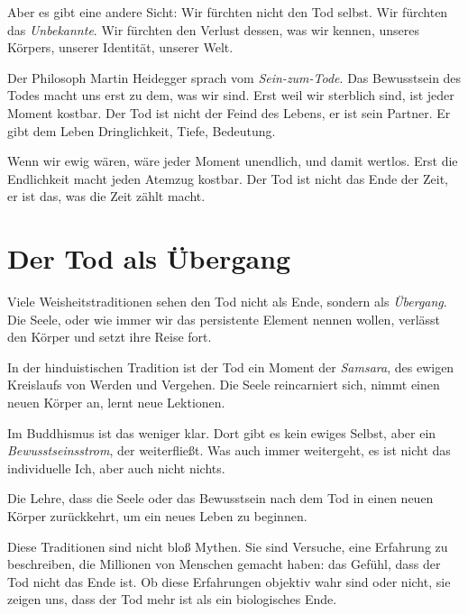 Aber es gibt eine andere Sicht: Wir fürchten nicht den Tod selbst. Wir fürchten das \emph{Unbekannte}. Wir fürchten den Verlust dessen, was wir kennen, unseres Körpers, unserer Identität, unserer Welt.

Der Philosoph Martin Heidegger \cite{Heidegger1927} sprach vom \emph{Sein-zum-Tode}. Das Bewusstsein des Todes macht uns erst zu dem, was wir sind. Erst weil wir sterblich sind, ist jeder Moment kostbar. Der Tod ist nicht der Feind des Lebens, er ist sein Partner. Er gibt dem Leben Dringlichkeit, Tiefe, Bedeutung.

Wenn wir ewig wären, wäre jeder Moment unendlich, und damit wertlos. Erst die Endlichkeit macht jeden Atemzug kostbar. Der Tod ist nicht das Ende der Zeit, er ist das, was die Zeit \glqq zählt\grqq{} macht.

\section{Der Tod als Übergang}

Viele Weisheitstraditionen sehen den Tod nicht als Ende, sondern als \emph{Übergang}. Die Seele, oder wie immer wir das persistente Element nennen wollen, verlässt den Körper und setzt ihre Reise fort.

In der hinduistischen Tradition ist der Tod ein Moment der \emph{Samsara}, des ewigen Kreislaufs von Werden und Vergehen. Die Seele reincarniert sich, nimmt einen neuen Körper an, lernt neue Lektionen.

Im Buddhismus ist das weniger klar. Dort gibt es kein ewiges Selbst, aber ein \emph{Bewusstseinsstrom}, der weiterfließt. Was auch immer weitergeht, es ist nicht das individuelle Ich, aber auch nicht nichts.

\begin{defi}[Reinkarnation]
	Die Lehre, dass die Seele oder das Bewusstsein nach dem Tod in einen neuen Körper zurückkehrt, um ein neues Leben zu beginnen.
\end{defi}

Diese Traditionen sind nicht bloß Mythen. Sie sind Versuche, eine Erfahrung zu beschreiben, die Millionen von Menschen gemacht haben: das Gefühl, dass der Tod nicht das Ende ist. Ob diese Erfahrungen \glqq objektiv\grqq{} wahr sind oder nicht, sie zeigen uns, dass der Tod mehr ist als ein biologisches Ende.

